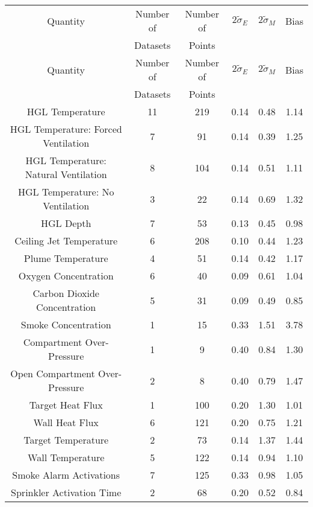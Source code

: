 \begin{center}
\begin{longtable}{|c|c|c|c|c|c|}
\hline
Quantity & Number of & Number of & $2\widetilde{\sigma}_E$ & $2\widetilde{\sigma}_M$ & Bias \\
         & Datasets  & Points    &                         &                         &      \\ \hline \hline
\endfirsthead
\hline
Quantity & Number of & Number of & $2\widetilde{\sigma}_E$ & $2\widetilde{\sigma}_M$ & Bias \\
         & Datasets  & Points    &                         &                         &      \\ \hline \hline
\endhead
HGL Temperature & 11 & 219 & 0.14 & 0.48 & 1.14 \\ \hline
HGL Temperature: Forced Ventilation & 7 & 91 & 0.14 & 0.39 & 1.25 \\ \hline
HGL Temperature: Natural Ventilation & 8 & 104 & 0.14 & 0.51 & 1.11 \\ \hline
HGL Temperature: No Ventilation & 3 & 22 & 0.14 & 0.69 & 1.32 \\ \hline
HGL Depth & 7 & 53 & 0.13 & 0.45 & 0.98 \\ \hline
Ceiling Jet Temperature & 6 & 208 & 0.10 & 0.44 & 1.23 \\ \hline
Plume Temperature & 4 & 51 & 0.14 & 0.42 & 1.17 \\ \hline
Oxygen Concentration & 6 & 40 & 0.09 & 0.61 & 1.04 \\ \hline
Carbon Dioxide Concentration & 5 & 31 & 0.09 & 0.49 & 0.85 \\ \hline
Smoke Concentration & 1 & 15 & 0.33 & 1.51 & 3.78 \\ \hline
Compartment Over-Pressure & 1 & 9 & 0.40 & 0.84 & 1.30 \\ \hline
Open Compartment Over-Pressure & 2 & 8 & 0.40 & 0.79 & 1.47 \\ \hline
Target Heat Flux & 1 & 100 & 0.20 & 1.30 & 1.01 \\ \hline
Wall Heat Flux & 6 & 121 & 0.20 & 0.75 & 1.21 \\ \hline
Target Temperature & 2 & 73 & 0.14 & 1.37 & 1.44 \\ \hline
Wall Temperature & 5 & 122 & 0.14 & 0.94 & 1.10 \\ \hline
Smoke Alarm Activations & 7 & 125 & 0.33 & 0.98 & 1.05 \\ \hline
Sprinkler Activation Time & 2 & 68 & 0.20 & 0.52 & 0.84 \\ \hline
\end{longtable}
\end{center}

